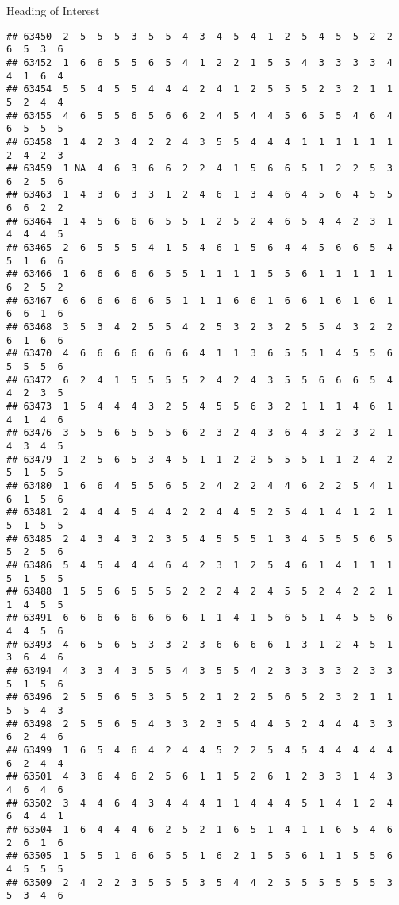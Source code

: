 \documentclass[
  ignorenonframetext,
]{beamer}
\begin{document}
\begin{frame}[fragile]{Heading of Interest}
\begin{verbatim}
## 63450  2  5  5  5  3  5  5  4  3  4  5  4  1  2  5  4  5  5  2  2  6  5  3  6
## 63452  1  6  6  5  5  6  5  4  1  2  2  1  5  5  4  3  3  3  3  4  4  1  6  4
## 63454  5  5  4  5  5  4  4  4  2  4  1  2  5  5  5  2  3  2  1  1  5  2  4  4
## 63455  4  6  5  5  6  5  6  6  2  4  5  4  4  5  6  5  5  4  6  4  6  5  5  5
## 63458  1  4  2  3  4  2  2  4  3  5  5  4  4  4  1  1  1  1  1  1  2  4  2  3
## 63459  1 NA  4  6  3  6  6  2  2  4  1  5  6  6  5  1  2  2  5  3  6  2  5  6
## 63463  1  4  3  6  3  3  1  2  4  6  1  3  4  6  4  5  6  4  5  5  6  6  2  2
## 63464  1  4  5  6  6  6  5  5  1  2  5  2  4  6  5  4  4  2  3  1  4  4  4  5
## 63465  2  6  5  5  5  4  1  5  4  6  1  5  6  4  4  5  6  6  5  4  5  1  6  6
## 63466  1  6  6  6  6  6  5  5  1  1  1  1  5  5  6  1  1  1  1  1  6  2  5  2
## 63467  6  6  6  6  6  6  5  1  1  1  6  6  1  6  6  1  6  1  6  1  6  6  1  6
## 63468  3  5  3  4  2  5  5  4  2  5  3  2  3  2  5  5  4  3  2  2  6  1  6  6
## 63470  4  6  6  6  6  6  6  6  4  1  1  3  6  5  5  1  4  5  5  6  5  5  5  6
## 63472  6  2  4  1  5  5  5  5  2  4  2  4  3  5  5  6  6  6  5  4  4  2  3  5
## 63473  1  5  4  4  4  3  2  5  4  5  5  6  3  2  1  1  1  4  6  1  4  1  4  6
## 63476  3  5  5  6  5  5  5  6  2  3  2  4  3  6  4  3  2  3  2  1  4  3  4  5
## 63479  1  2  5  6  5  3  4  5  1  1  2  2  5  5  5  1  1  2  4  2  5  1  5  5
## 63480  1  6  6  4  5  5  6  5  2  4  2  2  4  4  6  2  2  5  4  1  6  1  5  6
## 63481  2  4  4  4  5  4  4  2  2  4  4  5  2  5  4  1  4  1  2  1  5  1  5  5
## 63485  2  4  3  4  3  2  3  5  4  5  5  5  1  3  4  5  5  5  6  5  5  2  5  6
## 63486  5  4  5  4  4  4  6  4  2  3  1  2  5  4  6  1  4  1  1  1  5  1  5  5
## 63488  1  5  5  6  5  5  5  2  2  2  4  2  4  5  5  2  4  2  2  1  1  4  5  5
## 63491  6  6  6  6  6  6  6  6  1  1  4  1  5  6  5  1  4  5  5  6  4  4  5  6
## 63493  4  6  5  6  5  3  3  2  3  6  6  6  6  1  3  1  2  4  5  1  3  6  4  6
## 63494  4  3  3  4  3  5  5  4  3  5  5  4  2  3  3  3  3  2  3  3  5  1  5  6
## 63496  2  5  5  6  5  3  5  5  2  1  2  2  5  6  5  2  3  2  1  1  5  5  4  3
## 63498  2  5  5  6  5  4  3  3  2  3  5  4  4  5  2  4  4  4  3  3  6  2  4  6
## 63499  1  6  5  4  6  4  2  4  4  5  2  2  5  4  5  4  4  4  4  4  6  2  4  4
## 63501  4  3  6  4  6  2  5  6  1  1  5  2  6  1  2  3  3  1  4  3  4  6  4  6
## 63502  3  4  4  6  4  3  4  4  4  1  1  4  4  4  5  1  4  1  2  4  6  4  4  1
## 63504  1  6  4  4  4  6  2  5  2  1  6  5  1  4  1  1  6  5  4  6  2  6  1  6
## 63505  1  5  5  1  6  6  5  5  1  6  2  1  5  5  6  1  1  5  5  6  4  5  5  5
## 63509  2  4  2  2  3  5  5  5  3  5  4  4  2  5  5  5  5  5  5  3  5  3  4  6

\end{verbatim}
\end{frame}
\end{document}
